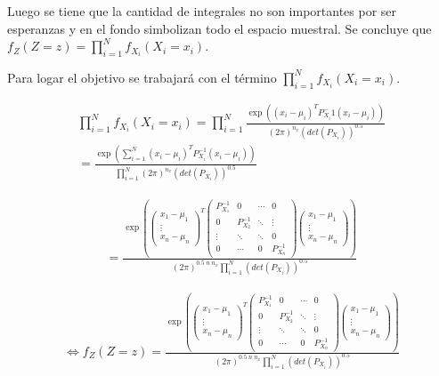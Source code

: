 	Luego se tiene que la cantidad de integrales no son importantes por ser esperanzas y en el fondo simbolizan todo el espacio muestral. Se concluye que $f_Z(Z=z) = \prod_{i=1}^Nf_{X_i}(X_i=x_i)$. \newline 

	Para logar el objetivo se trabajará con el término $\prod_{i=1}^Nf_{X_i}(X_i=x_i)$.

	 \begin{eqnarray}
		 \prod_{i=1}^N  f_{X_i}(X_i=x_i) =  \prod_{i=1}^N \frac{\exp( (x_i - \mu_i)^T P_{X_i}^-1 (x_i - \mu_i) ) }{(2\pi)^{n_x}(det(P_{X_i}))^{0.5}}\\
		 = \frac{\exp(\sum_{i=1}^N (x_i - \mu_i)^T P_{X_i}^{-1} (x_i - \mu_i) ) }{\prod_{i=1}^N (2\pi)^{n_x} (det(P_{X_i}))^{0.5}}
	\end{eqnarray}

	\begin{eqnarray} 
		= \frac{\exp( 
		 	 \begin{pmatrix}
			  x_1 - \mu_1 \\
			  \vdots \\
			  x_n - \mu_n 
			 \end{pmatrix}^T
		 	 \begin{pmatrix}
			  P_{X_1}^{-1} & 0 & \cdots & 0 \\
			  0 & P_{X_2}^{-1} &  \ddots & \vdots\\
			   \vdots & \ddots &\ddots  & 0\\
			   0 & \cdots &  0 & P_{X_n}^{-1}
			 \end{pmatrix}
			 \begin{pmatrix}
			  x_1 - \mu_1 \\
			  \vdots \\
			  x_n - \mu_n 
			 \end{pmatrix})}{(2\pi)^{0.5\;n\;n_x}\prod_{i=1}^N(det(P_{X_i}))^{0.5}} 
	\end{eqnarray}

	\begin{eqnarray} 
		\iff f_Z(Z=z)= \frac{\exp( 
		 	 \begin{pmatrix}
			  x_1 - \mu_1 \\
			  \vdots \\
			  x_n - \mu_n 
			 \end{pmatrix}^T
		 	 \begin{pmatrix}
			  P_{X_1}^{-1} & 0 & \cdots & 0 \\
			  0 & P_{X_2}^{-1} &  \ddots & \vdots\\
			   \vdots & \ddots &\ddots  & 0\\
			   0 & \cdots &  0 & P_{X_n}^{-1}
			 \end{pmatrix}
			 \begin{pmatrix}
			  x_1 - \mu_1 \\
			  \vdots \\
			  x_n - \mu_n 
			 \end{pmatrix})}{(2\pi)^{0.5\;n\;n_x}\prod_{i=1}^N(det(P_{X_i}))^{0.5}}
	\end{eqnarray}

